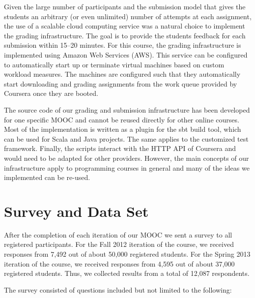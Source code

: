 \documentclass{sig-alternate}
\begin{document}
Given the large number of participants and the submission model that gives the
students an arbitrary (or even unlimited) number of attempts at each assignment, the use of a scalable
cloud computing service was a natural choice to implement the grading infrastructure.
The goal is to provide the students feedback for each submission within 15--20
minutes. For this course, the grading infrastructure is implemented using Amazon
Web Services (AWS). This service can be configured to automatically start up or
terminate virtual machines based on custom workload measures. The machines are
configured such that they automatically start downloading and grading assignments
from the work queue provided by Coursera once they are booted.

The source code of our grading and submission infrastructure has been developed
for one specific MOOC and cannot be reused directly for other online courses.
Most of the implementation is written as a plugin for the sbt build tool, which
can be used for Scala and Java projects. The same applies to the customized test
framework. Finally, the scripts interact with the HTTP API of Coursera and would
need to be adapted for other providers. However, the main concepts of our
infrastructure apply to programming courses in general and many of the ideas
we implemented can be re-used.




\section{Survey and Data Set}
\label{sec:survey-data-set}

After the completion of each iteration of our MOOC we sent a survey to all
registered participants. For the Fall 2012 iteration of the course, we
received responses from 7,492 out of about 50,000 registered students. For the
Spring 2013 iteration of the course, we received responses from 4,595 out of
about 37,000 registered students. Thus, we collected results from a total of
12,087 respondents.

The survey consisted of questions included but not limited to the following:
\end{document}
